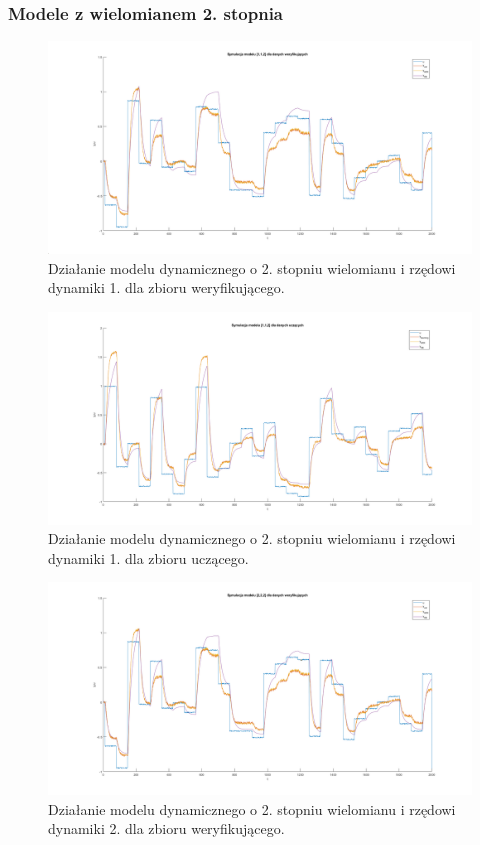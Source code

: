 \subsubsection{Modele z wielomianem 2. stopnia}
\begin{figure}[H]
\centering
\includegraphics[width=16cm,trim={5cm 1cm 5cm 1cm},clip]{images/d7.png}
\caption{Działanie modelu dynamicznego o 2. stopniu wielomianu i rzędowi dynamiki 1. dla zbioru weryfikującego.}
\label{fig:d7}
\end{figure}
\begin{figure}[H]
\centering
\includegraphics[width=16cm,trim={5cm 1cm 5cm 1cm},clip]{images/d8.png}
\caption{Działanie modelu dynamicznego o 2. stopniu wielomianu i rzędowi dynamiki 1. dla zbioru uczącego.}
\label{fig:d8}
\end{figure}
\begin{figure}[H]
\centering
\includegraphics[width=16cm,trim={5cm 1cm 5cm 1cm},clip]{images/d9.png}
\caption{Działanie modelu dynamicznego o 2. stopniu wielomianu i rzędowi dynamiki 2. dla zbioru weryfikującego.}
\label{fig:d9}
\end{figure}
